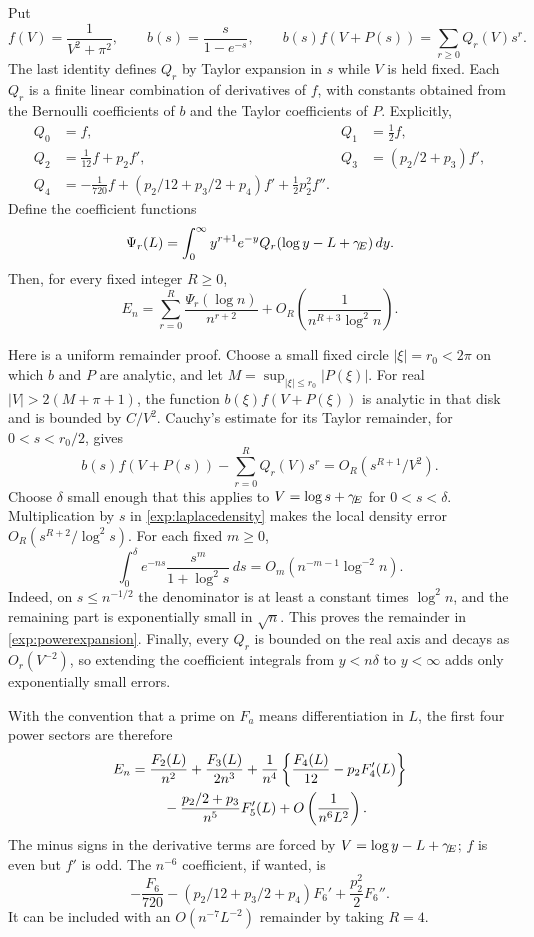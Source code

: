 Put
\[
 f(V)=\frac1{V^2+\pi^2},\qquad b(s)=\frac{s}{1-e^{-s}},
 \qquad
 b(s)f(V+P(s))=\sum_{r\geq0}Q_r(V)s^r.
\]
The last identity defines $Q_r$ by Taylor expansion in $s$ while $V$ is held
fixed. Each $Q_r$ is a finite linear combination of derivatives of $f$, with
constants obtained from the Bernoulli coefficients of $b$ and the Taylor
coefficients of $P$. Explicitly,
\begin{align*}
 Q_0&=f,&Q_1&=\tfrac12f,\\
 Q_2&=\tfrac1{12}f+p_2f',&
 Q_3&=(p_2/2+p_3)f',\\
 Q_4&=-\tfrac1{720}f+(p_2/12+p_3/2+p_4)f'
                    +\tfrac12p_2^2 f''.
\end{align*}
Define the coefficient functions
\[
 \Psi_r(L)=\int_0^\infty
   y^{r+1}e^{-y}Q_r(\log y-L+\gamma_{\!E})\,dy.
\]
Then, for every fixed integer $R\geq0$,
\begin{equation}\label{exp:powerexpansion}
 E_n=\sum_{r=0}^{R}\frac{\Psi_r(\log n)}{n^{r+2}}
       +O_R\left(\frac1{n^{R+3}\log^2n}\right).
\end{equation}

Here is a uniform remainder proof. Choose a small fixed circle
$|\xi|=r_0<2\pi$ on which $b$ and $P$ are analytic, and let
$M=\sup_{|\xi|\leq r_0}|P(\xi)|$.
For real $|V|>2(M+\pi+1)$, the function
$b(\xi)f(V+P(\xi))$ is analytic in that disk and is bounded by $C/V^2$.
Cauchy's estimate for its Taylor remainder, for $0<s<r_0/2$, gives
\[
 b(s)f(V+P(s))-\sum_{r=0}^{R}Q_r(V)s^r
       =O_R(s^{R+1}/V^2).
\]
Choose $\delta$ small enough that this applies to
$V=\log s+\gamma_{\!E}$ for $0<s<\delta$.
Multiplication by $s$ in \eqref{exp:laplacedensity} makes the local density
error $O_R(s^{R+2}/\log^2s)$.
For each fixed $m\geq0$,
\[
 \int_0^\delta e^{-ns}\frac{s^m}{1+\log^2s}\,ds
       =O_m(n^{-m-1}\log^{-2}n).
\]
Indeed, on $s\leq n^{-1/2}$ the denominator is at least a constant times
$\log^2n$, and the remaining part is exponentially small in $\sqrt n$.
This proves the remainder in \eqref{exp:powerexpansion}.
Finally, every $Q_r$ is bounded on the real axis and decays as $O_r(V^{-2})$,
so extending the coefficient integrals from $y<n\delta$ to $y<\infty$
adds only exponentially small errors.

With the convention that a prime on $F_a$ means differentiation in $L$,
the first four power sectors are therefore
\begin{align}\label{exp:fourpowers}
 E_n={}&\frac{F_2(L)}{n^2}+\frac{F_3(L)}{2n^3}
 +\frac1{n^4}\left\{\frac{F_4(L)}{12}-p_2F_4'(L)\right\}\notag\\
 &\quad-\frac{p_2/2+p_3}{n^5}F_5'(L)
       +O\left(\frac1{n^6L^2}\right).
\end{align}
The minus signs in the derivative terms are forced by
$V=\log y-L+\gamma_{\!E}$; $f$ is even but $f'$ is odd.
The $n^{-6}$ coefficient, if wanted, is
\[
 -\frac{F_6}{720}-(p_2/12+p_3/2+p_4)F_6'
                       +\frac{p_2^2}{2}F_6''.
\]
It can be included with an $O(n^{-7}L^{-2})$ remainder by taking $R=4$.

